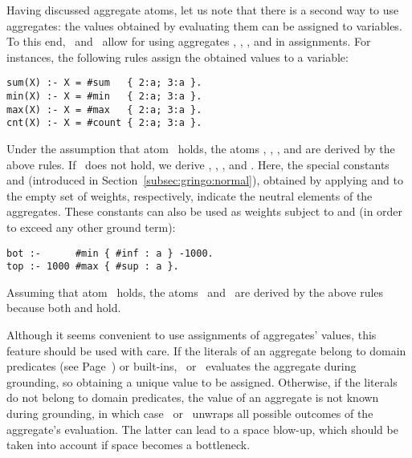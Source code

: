 Having discussed aggregate atoms,
let us note that there is a second way to use aggregates:
the values obtained by evaluating them can be assigned to variables.
To this end, \gringo\ and \clingo\ allow for using aggregates
, , , and  in assignments.
%
%
For instances, the following rules assign the obtained values to a variable:
\begin{lstlisting}[numbers=none]
sum(X) :- X = #sum   { 2:a; 3:a }.
min(X) :- X = #min   { 2:a; 3:a }.
max(X) :- X = #max   { 2:a; 3:a }.
cnt(X) :- X = #count { 2:a; 3:a }.
\end{lstlisting}
Under the assumption that atom~ holds,
the atoms , ,
, and  are
derived by the above rules.
If~ does not hold, we derive 
, ,
, and .
%
Here, the special constants  and 
(introduced in Section~\ref{subsec:gringo:normal}),
obtained by applying  and  to the empty set of weights, respectively,
indicate the neutral elements of the aggregates.
%
These constants can also be used as weights subject to 
 and  (in order to exceed any other ground term):
\begin{lstlisting}[numbers=none]
bot :-      #min { #inf : a } -1000.
top :- 1000 #max { #sup : a }.
\end{lstlisting}
Assuming that atom~ holds,
the atoms~ and~ are derived by the above rules
because both  and  hold.

Although it seems convenient to use assignments of aggregates' values,
this feature should be used with care.
If the literals of an aggregate belong to domain predicates
(see Page~\pageref{pg:domain}) or built-ins,
\gringo\ or \clingo\ evaluates the aggregate during grounding, so obtaining
a unique value to be assigned.
%
%
Otherwise, if the literals do not belong to domain predicates,
the value of an aggregate is not known during grounding,
in which case \gringo\ or \clingo\ unwraps all possible outcomes of the
aggregate's evaluation.
The latter can lead to a space blow-up, which should be taken into account
if space becomes a bottleneck.


